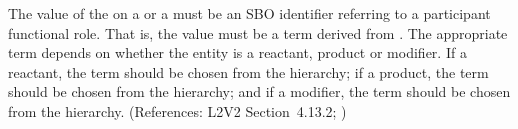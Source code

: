 The value of the   on a \SpeciesReference or a
\ModifierSpeciesReference must be an SBO identifier referring to a
participant functional role.  That is, the value must be a term derived
from \sboparticipantfunctional.  The appropriate term depends on whether
the entity is a reactant, product or modifier.  If a reactant, the term
should be chosen from the \sboreactant hierarchy; if a product, the term
should be chosen from the \sboproduct hierarchy; and if a modifier, the
term should be chosen from the \sbomodifier hierarchy.  (References: 
L2V2 Section~4.13.2; )
